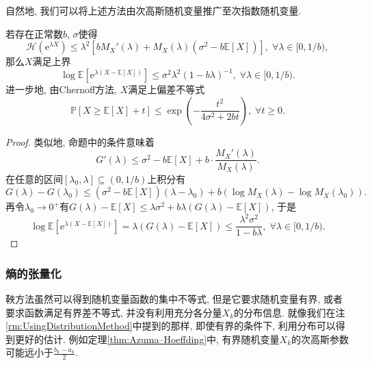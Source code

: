 自然地, 我们可以将上述方法由次高斯随机变量推广至次指数随机变量. 
\begin{proposition}[Bernstein熵的界]\label{thm:BernsteinEntropyBd}
	若存在正常数$b$, $\sigma$使得
	\begin{equation*}
		\mathcal{H}(\mathrm{e}^{\lambda X}) 
		\leq \lambda^2 \left[ b M_X'(\lambda) + M_X(\lambda)(\sigma^2 - b \mathbb{E}[X]) \right],\;
		\forall \lambda \in [0, 1/b), 
	\end{equation*}
	那么$X$满足上界
	\begin{equation*}
		\log \mathbb{E}\left[ \mathrm{e}^{\lambda(X - \mathbb{E}[X])}\right] 
		\leq \sigma^2 \lambda^2 (1 - b \lambda)^{-1},\; 
		\forall \lambda \in [0, 1/b). 
	\end{equation*}
	进一步地, 由Chernoff方法, $X$满足上偏差不等式
	\begin{equation*}
		\mathbb{P}[X \geq \mathbb{E}[X] + t] 
		\leq \exp \left(- \frac{t^2}{4 \sigma^2 + 2b t} \right),\;
		\forall t \geq 0. 
	\end{equation*}
\end{proposition}
\begin{proof}
	类似地, 命题中的条件意味着
	\begin{equation*}
		G'(\lambda) 
		\leq \sigma^2 - b \mathbb{E}[X] + b \cdot \frac{M_X'(\lambda)}{M_X(\lambda)}. 
	\end{equation*}
	在任意的区间$[\lambda_0, \lambda] \subseteq (0, 1/b)$上积分有
	\begin{equation*}
		G(\lambda) - G(\lambda_0) 
		\leq (\sigma^2 - b \mathbb{E}[X])(\lambda - \lambda_0) + b(\log M_X(\lambda) - \log M_X(\lambda_0)). 
	\end{equation*}
	再令$\lambda_0 \to 0^+$有$G(\lambda) - \mathbb{E}[X] \leq \lambda \sigma^2 + b \lambda (G(\lambda) - \mathbb{E}[X])$, 于是
	\begin{equation*}
		\log \mathbb{E}\left[\mathrm{e}^{\lambda(X - \mathbb{E}[X])}\right]
		= \lambda(G(\lambda) - \mathbb{E}[X])
		\leq \frac{\lambda^2 \sigma^2}{1 - b \lambda} ,\; 
		\forall \lambda \in [0, 1/b). 
	\end{equation*}
\end{proof}

\subsubsection{熵的张量化}

鞅方法虽然可以得到随机变量函数的集中不等式, 但是它要求随机变量有界, 或者要求函数满足有界差不等式, 并没有利用充分各分量$X_k$的分布信息. 
就像我们在注\ref{rm:UsingDistributionMethod}中提到的那样, 即使有界的条件下, 利用分布可以得到更好的估计. 
例如定理\ref{thm:Azuma–Hoeffding}中, 有界随机变量$X_k$的次高斯参数可能远小于$\frac{b_k - a_k}{2}$. 

